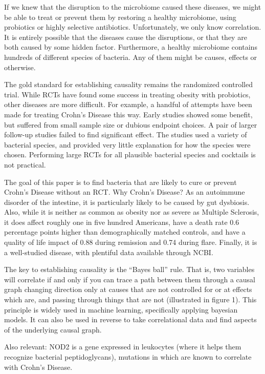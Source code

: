 \documentclass[a4paper]{article}
\begin{document}
If we knew that the disruption to the microbiome caused these
diseases, we might be able to treat or prevent them by restoring a
healthy microbiome, using probiotics or highly selective antibiotics.
Unfortunately, we only know correlation.  It is entirely possible that
the diseases cause the disruptions, or that they are both caused by
some hidden factor.  Furthermore, a healthy microbiome contains
hundreds of different species of bacteria.  Any of them might be
causes, effects or otherwise.


The gold standard for establishing causality remains the randomized
controlled trial.  While RCTs have found some success in treating
obesity with probiotics\cite{rctob}, other diseases are more difficult.  For
example, a handful of attempts have been made for treating Crohn's
Disease this way.  Early studies showed some benefit, but suffered
from small sample size or dubious endpoint choices.   A pair of larger
follow-up studies failed to find significant effect.\cite{rctma}  The studies
used a variety of bacterial species, and provided very little
explanation for how the species were chosen.  Performing large RCTs
for all plausible bacterial species and cocktails is not practical.


The goal of this paper is to find bacteria that are likely to
cure or prevent Crohn's Disease without an RCT.  Why Crohn's Disease?
As an autoimmune disorder of the intestine, it is particularly likely
to be caused by gut dysbiosis.  Also, while it is neither as common as
obesity nor as severe as Multiple Sclerosis, it does affect roughly
one in five hundred Americans, have a death rate 0.6 percentage points
higher than demographically matched controls\cite{mort}, and have a
quality of life impact of 0.88 during remission and 0.74 during
flare\cite{qol}.  Finally, it is a well-studied disease, with plentiful data
available through NCBI.

The key to establishing causality is the ``Bayes ball'' rule.
That is, two variables will correlate if and only if you can
trace a path between them through a causal graph changing direction
only at causes that are not controlled for or at effects which are,
and passing through things that are not (illustrated in figure 1).  This
principle is widely used in machine learning, specifically applying
bayesian models.  It can also be used in reverse to take correlational
data and find aspects of the underlying causal graph.\cite{causal}

Also relevant: NOD2 is a gene expressed in leukocytes (where it helps
them recognize bacterial peptidoglycans),
mutations in which are known\cite{data} to correlate with Crohn's Disease.
\end{document}
